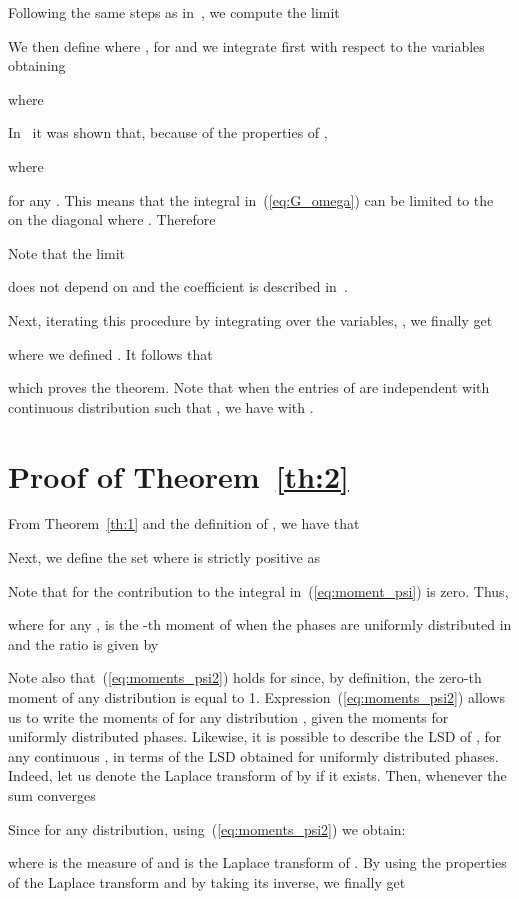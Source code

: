 \documentclass[11pt, draftcls, onecolumn, a4paper]{IEEEtran}
\begin{document}
Following the same steps as in~\cite[Appendix H]{RyanDebbah}, we compute the limit  

We then define  where , for  
and we integrate first with respect to the variables  obtaining

where

In~\cite[Appendix H]{RyanDebbah} it was shown that, because of the properties of ,

where
 
for any .  This means that the integral
in~(\ref{eq:G_omega}) can be limited to the  on
the diagonal where . Therefore

Note that the limit
 
does not depend on  and the coefficient  is described in~\cite{TSP2}.

Next, iterating this procedure by integrating over the variables, ,  we finally get

where we defined .  It follows that

which proves the theorem. Note that when the entries of
 are independent with continuous
distribution  such that , we have  with
.

\section{Proof of Theorem~\ref{th:2}}
\label{app:th2}
From Theorem~\ref{th:1} and the definition of , we have that

Next, we define the set  where  is strictly positive
as

Note that for  the contribution to the
  integral in~(\ref{eq:moment_psi}) is zero. Thus,

where for any ,  is the -th moment
of  when the phases are uniformly
distributed in  and the ratio  is given by

Note also that~(\ref{eq:moments_psi2}) holds for  since, by
definition, the zero-th moment of any distribution is equal to
1. Expression~(\ref{eq:moments_psi2}) allows us to write the moments of
 for any distribution , given the moments for
uniformly distributed phases.  Likewise, it is possible to describe
the LSD of , for any continuous , in terms of
the LSD obtained for uniformly distributed phases.  Indeed, let us
denote the Laplace transform of  by
 if it exists. Then, whenever the sum
converges

Since  for any distribution,
using~(\ref{eq:moments_psi2}) we obtain:

where  is the measure of  and 
is the Laplace transform of . By using the
properties of the Laplace transform and by taking its inverse, we
finally get
\end{document}
